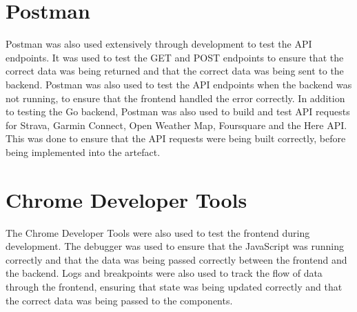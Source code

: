 \section{Postman}
\label{testing:postman}

Postman was also used extensively through development to test the API endpoints. It was used to test the GET and POST endpoints to ensure that the correct data was being returned and that the correct data was being sent to the backend. Postman was also used to test the API endpoints when the backend was not running, to ensure that the frontend handled the error correctly. In addition to testing the Go backend, Postman was also used to build and test API requests for Strava, Garmin Connect, Open Weather Map, Foursquare and the Here API. This was done to ensure that the API requests were being built correctly, before being implemented into the artefact.

\section{Chrome Developer Tools}
\label{testing:chrome-dev}

The Chrome Developer Tools were also used to test the frontend during development. The debugger was used to ensure that the JavaScript was running correctly and that the data was being passed correctly between the frontend and the backend. Logs and breakpoints were also used to track the flow of data through the frontend, ensuring that state was being updated correctly and that the correct data was being passed to the components.